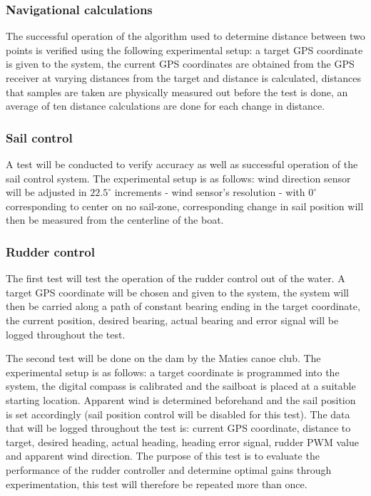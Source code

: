 \subsubsection{Navigational calculations}
The successful operation of the algorithm used to determine distance between two points is verified using the following experimental setup: a target GPS 
coordinate is given to the system, the current GPS coordinates are obtained from the GPS receiver at varying distances from the target and distance is 
calculated, distances that samples are taken are physically measured out before the test is done, an average of ten distance calculations are done for each
change in distance. 


\subsubsection{Sail control}
A test will be conducted to verify accuracy as well as successful operation of the sail control system. The experimental setup is as follows: wind direction 
sensor will be adjusted in $22.5^{\circ}$ increments - wind sensor's resolution - with $0^{\circ}$ corresponding to center on no sail-zone, corresponding 
change in sail position will then be measured from the centerline of the boat.

\subsubsection{Rudder control}
The first test will test the operation of the rudder control out of the water. A target GPS coordinate will be chosen and given to the system, the system 
will then be carried along a path of constant bearing ending in the target coordinate, the current position, desired bearing, actual bearing and error signal
will be logged throughout the test. 

The second test will be done on the dam by the Maties canoe club. The experimental setup is as follows: a target coordinate is programmed into the system,
the digital compass is calibrated and the sailboat is placed at a suitable starting location. Apparent wind is determined beforehand and the sail position is 
set accordingly (sail position control will be disabled for this test). The data that will be logged throughout the test is: current GPS coordinate, distance 
to target, desired heading, actual heading, heading error signal, rudder PWM value and apparent wind direction. The purpose of this test is to evaluate the performance
of the rudder controller and determine optimal gains through experimentation, this test will therefore be repeated more than once.

